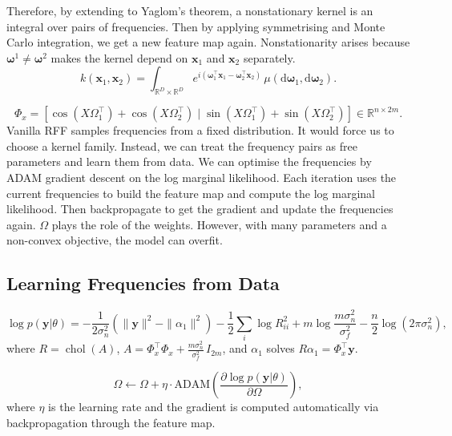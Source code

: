 \documentclass[11pt,a4paper]{article}
\begin{document}
Therefore, by extending to Yaglom's theorem, a nonstationary kernel is an
integral over pairs of frequencies. Then by applying symmetrising and Monte
Carlo integration, we get a new feature map again. Nonstationarity arises
because $\boldsymbol{\omega}^1 \neq \boldsymbol{\omega}^2$ makes the kernel
depend on $\mathbf{x}_1$ and $\mathbf{x}_2$ separately.
\begin{equation}
  k(\mathbf{x}_1, \mathbf{x}_2) = \int_{\mathbb{R}^D \times \mathbb{R}^D} e^{i(\boldsymbol{\omega}_1^\top \mathbf{x}_1 - \boldsymbol{\omega}_2^\top \mathbf{x}_2)} \, \mu(\mathrm{d}\boldsymbol{\omega}_1, \mathrm{d}\boldsymbol{\omega}_2).
\end{equation}

\begin{equation}
  \Phi_x = \left[ \cos(X \Omega_1^\top) + \cos(X \Omega_2^\top) \;\big|\; \sin(X \Omega_1^\top) + \sin(X \Omega_2^\top) \right] \in \mathbb{R}^{n \times 2m}.
\end{equation}
Vanilla RFF samples frequencies from a fixed distribution. It would force us
to choose a kernel family. Instead, we can treat the frequency pairs as free
parameters and learn them from data. We can optimise the frequencies by ADAM
gradient descent on the log marginal likelihood. Each iteration uses the
current frequencies to build the feature map and compute the log marginal
likelihood. Then backpropagate to get the gradient and update the frequencies
again. $\Omega$ plays the role of the weights. However, with many parameters
and a non-convex objective, the model can overfit.
\subsection{Learning Frequencies from Data}
\begin{equation}
  \log p(\mathbf{y}|\theta) = -\frac{1}{2\sigma_n^2}\left(\|\mathbf{y}\|^2 - \|\alpha_1\|^2\right) - \frac{1}{2}\sum_i \log R_{ii}^2 + m\log\frac{m\sigma_n^2}{\sigma_f^2} - \frac{n}{2}\log(2\pi \sigma_n^2),
\end{equation}
where $R = \operatorname{chol}(A)$, $A = \Phi_x^\top \Phi_x + \tfrac{m\sigma_n^2}{\sigma_f^2}\, I_{2m}$, and $\alpha_1$ solves $R\alpha_1 = \Phi_x^\top \mathbf{y}$.

\begin{equation}
  \Omega \leftarrow \Omega + \eta \cdot \mathrm{ADAM}\!\left( \frac{\partial \log p(\mathbf{y}|\theta)}{\partial \Omega} \right),
\end{equation}
where $\eta$ is the learning rate and the gradient is computed automatically via backpropagation through the feature map.
\end{document}
